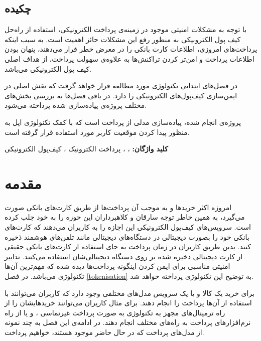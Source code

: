 \documentclass[oneside]{report}
\begin{document}
\newpage


\restoregeometry
\linespread{1.3}
 \section*{چکیده}
\Large \noindent
با توجه به مشکلات امنیتی موجود در زمینه‌ی پرداخت الکترونیکی،‌ استفاده از راه‌حل‌ کیف پول الکترونیکی به منظور رفع این مشکلات حائز اهمیت است. به سبب اینکه پرداخت‌های امروزی، اطلاعات کارت بانکی را در معرض خطر قرار می‌دهند، پنهان بودن اطلاعات پرداخت و امن‌تر کردن تراکنش‌ها به علاوه‌ی سهولت پرداخت، از هداف اصلی کیف پول ‌الکترونیکی می‌باشد.

\noindent
در فصل‌های ابتدایی تکنولوژی‌
	{\normalsize {}}
مورد مطالعه قرار خواهد گرفت که نقش اصلی در ایمن‌سازی کیف‌پول‌های الکترونیکی را دارد. در باقی فصل‌ها به بررسی بخش‌های مختلف پروژه‌ی پیاده‌سازی شده پرداخته می‌شود.

\noindent
پروژه‌ی انجام شده، پیاده‌سازی مدلی از پرداخت است که با کمک تکنولوژی
{\normalsize {}}
اپل به منظور پیدا کردن موقعیت کاربر مورد استفاده قرار گرفته است.


\vspace*{1cm}
\noindent
\textbf{کلید واژگان: } 
{\large {}} ، {\large {}} ، پرداخت الکترونیک ، کیف‌پول الکترونیکی

{\let\cleardoublepage\clearpage 
	\tableofcontents
}
	\chapter{مقدمه}\label{introduction}
		امروزه اکثر خرید‌ها و به موجب آن پرداخت‌ها از طریق کارت‌های بانکی صورت می‌گیرد، به همین خاطر توجه سارقان و کلاهبرداران این حوزه را به خود جلب کرده است. سرویس‌های کیف‌پول الکترونیکی این اجازه را به کاربران می‌دهند که کارت‌های بانکی خود را بصورت دیجیتالی در دستگاه‌های دیجیتالی مانند تلفن‌های هوشمند ذخیره کنند. بدین طریق کاربران در زمان پرداخت به جای استفاده از کارت‌های بانکی حقیقی از کارت دیجیتالی ذخیره شده بر روی دستگاه دیجیتالی‌شان استفاده می‌کنند. تدابیر امنیتی مناسبی برای ایمن کردن اینگونه پرداخت‌ها دیده شده که  مهم‌ترین آن‌ها تکنولوژی  {\normalsize {}}  می‌باشد. در فصل \ref{tokenisation} به توضیح این تکنولوژی پرداخته خواهد شد.
		
		برای خرید یک کالا و یا یک سرویس مدل‌های مختلفی وجود دارد که کاربران می‌توانند با استفاده از آن‌ها پرداخت را انجام دهند. برای مثال کاربران می‌توانند خریدهایشان را از راه ترمینال‌های مجهز به تکنولوژی 
			{\normalsize {}}
		به صورت پرداخت غیرتماسی ،   و یا از راه نرم‌افزار‌های پرداخت به راه‌های مختلف انجام دهند. در ادامه‌ی این فصل به چند نمونه از مدل‌های پرداخت که در حال حاضر موجود هستند، خواهیم پرداخت.		
			  
\end{document}
